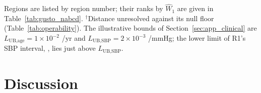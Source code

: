 \documentclass[AMA,Times1COL]{WileyNJDv5}
\begin{document}
\begin{table}[ht]
\centering
\caption{$L^*$ at $\Delta_{\text{clin}} = 1$\%pt with 95\% percentile interval for all 15 partner regions, listed by region number. $L^*$ is the minimum clinical slope (per year for age, per mmHg for SBP) required for the observed distributional difference to produce a treatment effect difference of $1$\%pt on the absolute 30-day mortality scale.\label{tab:gusto_lstar_joint}}
\begin{tablenotes}
\item Regions are listed by region number; their ranks by $\widehat{W}_1$ are given in Table~\ref{tab:gusto_nabcd}. $^\dagger$Distance unresolved against its null floor (Table~\ref{tab:operability}). The illustrative bounds of Section~\ref{sec:app_clinical} are $L_{\text{UB,age}} = 1\times10^{-2}$ /yr and $L_{\text{UB,SBP}} = 2\times10^{-3}$ /mmHg; the lower limit of R1's SBP interval, , lies just above $L_{\text{UB,SBP}}$.
\end{tablenotes}
\end{table}

\section{Discussion}\label{sec:discussion}
\end{document}
